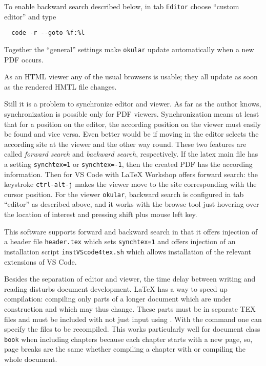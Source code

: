 To enable backward search described below, 
in tab \texttt{Editor} choose ``custom editor'' and type 
%
\begin{Verbatim}
  code -r --goto %f:%l
\end{Verbatim}

Together the ``general'' settings make \texttt{okular} update automatically 
when a new PDF occurs. 

As an HTML viewer any of the usual browsers is usable; 
they all update as soon as the rendered HMTL file changes. 

Still it is a problem to synchronize editor and viewer. 
As far as the author knows, synchronization is possible only for PDF viewers. 
Synchronization means at least that for a position on the editor, 
the according position on the viewer must easily be found 
and vice versa. 
Even better would be if moving in the editor selects the according site at the viewer 
and the other way round. 
These two features are called \emph{forward search} and \emph{backward search}, respectively. 
If the latex main file has a setting \texttt{synchtex=1} or \texttt{synchtex=-1}, 
then the created PDF has the according information. 
Then for VS Code with \LaTeX{} Workshop offers forward search: 
the keystroke \texttt{ctrl-alt-j} 
makes the viewer move to the site corresponding with the cursor position. 
For the viewer \texttt{okular}, backward search is configured in tab ``editor'' 
as described above, 
and it works with the browse tool just hovering over the location of interest 
and pressing shift plus mouse left key. 

This software supports forward and backward search 
in that it offers injection of a header file \texttt{header.tex} 
which sets \texttt{synchtex=1} 
and offers injection of an installation script \texttt{instVScode4tex.sh} 
which allows installation of the relevant extensions of VS Code. 
\medskip


Besides the separation of editor and viewer, 
the time delay between writing and reading 
disturbs document development. 
\LaTeX{} has a way to speed up compilation: 
compiling only parts of a longer document 
which are under construction and which may thus change. 
These parts must be in separate TEX files 
and must be included with  
not just input using . 
With the command  
one can specify the files to be recompiled. 
This works particularly well for document class \texttt{book} 
when including chapters because each chapter starts with a new page, 
so, page breaks are the same whether 
compiling a chapter with  
or compiling the whole document. 

